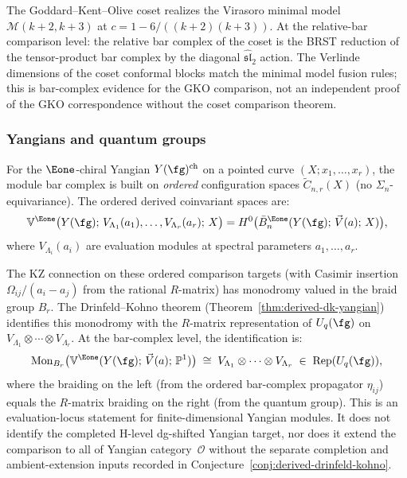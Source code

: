\begin{example}
\label{ex:gko-coset-bar}
The Goddard--Kent--Olive coset realizes the Virasoro minimal
model $\mathcal{M}(k+2, k+3)$ at $c = 1 - 6/((k+2)(k+3))$.
At the relative-bar comparison level: the relative bar complex of the coset
is the BRST reduction of the tensor-product bar complex by the
diagonal $\widehat{\mathfrak{sl}}_2$ action. The Verlinde
dimensions of the coset conformal blocks match the minimal model
fusion rules; this is bar-complex evidence for the GKO comparison, not
an independent proof of the GKO correspondence without the coset
comparison theorem.
\end{example}

\subsubsection{Yangians and quantum groups}

For the $\Eone$-chiral Yangian $Y(\fg)^{\mathrm{ch}}$ on a
pointed curve $(X; x_1, \ldots, x_r)$, the module bar complex
is built on \emph{ordered} configuration spaces
$\widetilde{C}_{n,r}(X)$ (no $\Sigma_n$-equivariance). The ordered
derived coinvariant spaces are:
\[
\mathbb{V}^{\Eone}\bigl(Y(\fg);\,
V_{\Lambda_1}(a_1), \ldots, V_{\Lambda_r}(a_r);\, X\bigr)
= H^0\bigl(\bar{B}^{\Eone}_n(Y(\fg);\,
\vec{V}(a);\, X)\bigr),
\]
where $V_{\Lambda_i}(a_i)$ are evaluation modules at spectral
parameters $a_1, \ldots, a_r$.

The KZ connection on these ordered comparison targets (with Casimir insertion
$\Omega_{ij}/(a_i - a_j)$ from the rational $R$-matrix) has
monodromy valued in the braid group $B_r$. The
Drinfeld--Kohno theorem
(Theorem~\ref{thm:derived-dk-yangian}) identifies this monodromy
with the $R$-matrix representation of $U_q(\fg)$ on
$V_{\Lambda_1} \otimes \cdots \otimes V_{\Lambda_r}$. At the
bar-complex level, the identification is:
\begin{equation}\label{eq:dk-conformal-blocks}
\mathrm{Mon}_{B_r}\bigl(
\mathbb{V}^{\Eone}(Y(\fg);\, \vec{V}(a);\, \mathbb{P}^1)\bigr)
\;\cong\;
V_{\Lambda_1} \otimes \cdots \otimes V_{\Lambda_r}
\;\in\; \operatorname{Rep}(U_q(\fg)),
\end{equation}
where the braiding on the left (from the ordered bar-complex
propagator $\eta_{ij}$) equals the $R$-matrix braiding on the
right (from the quantum group).
This is an evaluation-locus statement for finite-dimensional
Yangian modules. It does not identify the completed H-level
dg-shifted Yangian target, nor does it extend the comparison to all
of Yangian category~$\mathcal{O}$ without the separate completion and
ambient-extension inputs recorded in
Conjecture~\ref{conj:derived-drinfeld-kohno}.

